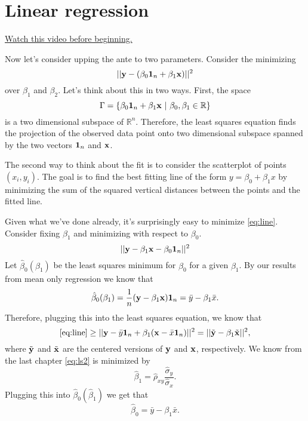 \chapter{Linear regression}

\href{https://www.youtube.com/watch?v=0PLufpySIcs&list=PLpl-gQkQivXhdgUCdaUQcdb31CRe8Mm2y&index=14}{Watch this video before beginning.}

Now let's consider upping the ante to two parameters. Consider the minimizing
\begin{equation}
\label{eq:line}
|| \mathbf{y} - (\beta_0 \mathbf{1}_n + \beta_1 \mathbf{x}) ||^2
\end{equation}
over $\beta_1$ and $\beta_2$. Let's think about this in two ways. 
First, the space $$\Gamma = \{\beta_0 \mathbf{1}_n + \beta_1 \mathbf{x} ~|~ \beta_0, \beta_1 \in \mathbb{R}\}$$
is a two dimensional subspace of $\mathbb{R}^n$. Therefore, the least squares
equation finds the projection of the observed data point 
onto two dimensional subspace spanned by the two vectors $\mathbf{1}_n$ and $\mathbf{x}$.

The second way to think about the fit is to consider the scatterplot
of points $(x_i, y_i)$. The goal is to find the best fitting line
of the form $y = \beta_0 + \beta_1 x$ by minimizing the sum of the
squared vertical distances between the points and the fitted line. 

Given what we've done already, it's surprisingly easy to minimize
\eqref{eq:line}. Consider fixing $\beta_1$ and minimizing
with respect to $\beta_0$.
$$
|| \mathbf{y} - \beta_1 \mathbf{x}  - \beta_0 \mathbf{1}_n ||^2
$$
Let $\hat \beta_0 (\beta_1)$ be the least squares minimum for $\beta_0$
for a given $\beta_1$. 
By our results from mean only regression we know that
\begin{equation*}
\label{eq:intercept}
\hat \beta_0 (\beta_1) = \frac{1}{n}(\mathbf{y} - \beta_1 \mathbf{x}) \mathbf{1}_n = \bar y - \beta_1 \bar x.
\end{equation*}
Therefore, plugging this into the least squares equation, we know that
\begin{equation}
\label{eq:ls2}
\eqref{eq:line} \geq 
|| \mathbf{y} -  \bar y \mathbf{1}_n + \beta_1 (\mathbf{x}  - \bar x \mathbf{1}_n) ||^2= || \tilde {\mathbf{y}} - \beta_1 \tilde {\mathbf{x}}||^2,
\end{equation}
where $\tilde {\mathbf{y}}$ and $\tilde {\mathbf{x}}$ are the centered versions of $\mathbf{y}$ and
$\mathbf{x}$, respectively. We know from the last chapter \eqref{eq:ls2} is minimized 
by 
$$\hat \beta_1 = \hat \rho_{xy} \frac{\hat \sigma_y}{\hat \sigma_x}.$$
Plugging this into $\hat \beta_0(\hat \beta_1)$ we get that
$$
\hat \beta_0 = \bar y - \beta_1 \bar x.
$$


